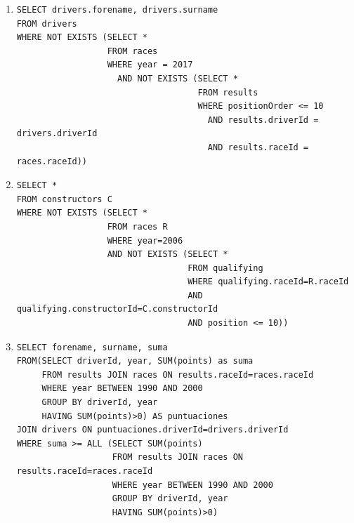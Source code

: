 \documentclass[a4paper]{article}
\begin{document}
\begin{enumerate}
            
    \item %
    \begin{verbatim}  
SELECT drivers.forename, drivers.surname
FROM drivers
WHERE NOT EXISTS (SELECT *
                  FROM races
                  WHERE year = 2017
                    AND NOT EXISTS (SELECT *
                                    FROM results
                                    WHERE positionOrder <= 10
                                      AND results.driverId = drivers.driverId
                                      AND results.raceId = races.raceId))
    \end{verbatim}
    
    \item %
    \begin{verbatim}  
SELECT *
FROM constructors C
WHERE NOT EXISTS (SELECT *
                  FROM races R
                  WHERE year=2006
                  AND NOT EXISTS (SELECT *
                                  FROM qualifying
                                  WHERE qualifying.raceId=R.raceId
                                  AND qualifying.constructorId=C.constructorId
                                  AND position <= 10))  

    \end{verbatim}

    \item %
    \begin{verbatim}
SELECT forename, surname, suma
FROM(SELECT driverId, year, SUM(points) as suma
     FROM results JOIN races ON results.raceId=races.raceId
     WHERE year BETWEEN 1990 AND 2000
     GROUP BY driverId, year
     HAVING SUM(points)>0) AS puntuaciones
JOIN drivers ON puntuaciones.driverId=drivers.driverId
WHERE suma >= ALL (SELECT SUM(points)
                   FROM results JOIN races ON results.raceId=races.raceId
                   WHERE year BETWEEN 1990 AND 2000
                   GROUP BY driverId, year
                   HAVING SUM(points)>0)


\end{verbatim}
\end{enumerate}
\end{document}
